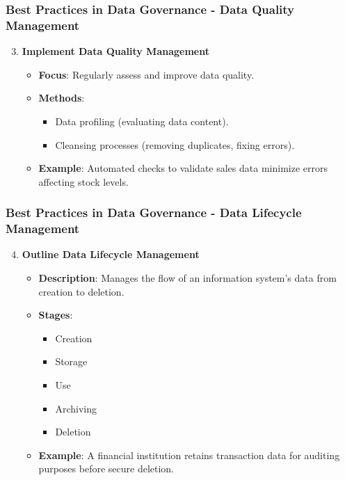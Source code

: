 \documentclass{beamer}
\begin{document}
\begin{frame}[fragile]
    \frametitle{Best Practices in Data Governance - Data Quality Management}
    \begin{enumerate}
        \setcounter{enumi}{2}
        \item \textbf{Implement Data Quality Management}
        \begin{itemize}
            \item \textbf{Focus}: Regularly assess and improve data quality.
            \item \textbf{Methods}:
                \begin{itemize}
                    \item Data profiling (evaluating data content).
                    \item Cleansing processes (removing duplicates, fixing errors).
                \end{itemize}
            \item \textbf{Example}: Automated checks to validate sales data minimize errors affecting stock levels.
        \end{itemize}
    \end{enumerate}
\end{frame}

\begin{frame}[fragile]
    \frametitle{Best Practices in Data Governance - Data Lifecycle Management}
    \begin{enumerate}
        \setcounter{enumi}{3}
        \item \textbf{Outline Data Lifecycle Management}
        \begin{itemize}
            \item \textbf{Description}: Manages the flow of an information system's data from creation to deletion.
            \item \textbf{Stages}:
                \begin{itemize}
                    \item Creation
                    \item Storage
                    \item Use
                    \item Archiving
                    \item Deletion
                \end{itemize}
            \item \textbf{Example}: A financial institution retains transaction data for auditing purposes before secure deletion.
        \end{itemize}
    \end{enumerate}
\end{frame}
\end{document}
